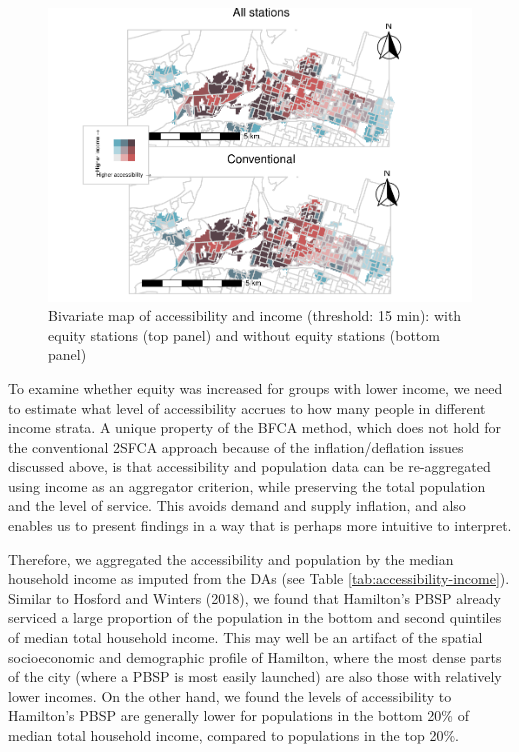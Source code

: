 \documentclass[]{elsarticle} %
\begin{document}
\begin{figure}
\includegraphics[width=1.2\linewidth]{Bike-share-spatial-equity_files/figure-latex/figure-bi-map-threshold-15-1} \caption{\label{fig-bivariate-map-threshold-15}Bivariate map of accessibility and income (threshold: 15 min): with equity stations (top panel) and without equity stations (bottom panel)}\label{fig:figure-bi-map-threshold-15}
\end{figure}

To examine whether equity was increased for groups with lower income, we
need to estimate what level of accessibility accrues to how many people
in different income strata. A unique property of the BFCA method, which
does not hold for the conventional 2SFCA approach because of the
inflation/deflation issues discussed above, is that accessibility and
population data can be re-aggregated using income as an aggregator
criterion, while preserving the total population and the level of
service. This avoids demand and supply inflation, and also enables us to
present findings in a way that is perhaps more intuitive to interpret.

Therefore, we aggregated the accessibility and population by the median
household income as imputed from the DAs (see Table
\ref{tab:accessibility-income}). Similar to Hosford and Winters (2018),
we found that Hamilton's PBSP already serviced a large proportion of the
population in the bottom and second quintiles of median total household
income. This may well be an artifact of the spatial socioeconomic and
demographic profile of Hamilton, where the most dense parts of the city
(where a PBSP is most easily launched) are also those with relatively
lower incomes. On the other hand, we found the levels of accessibility
to Hamilton's PBSP are generally lower for populations in the bottom
20\% of median total household income, compared to populations in the
top 20\%.
\end{document}
